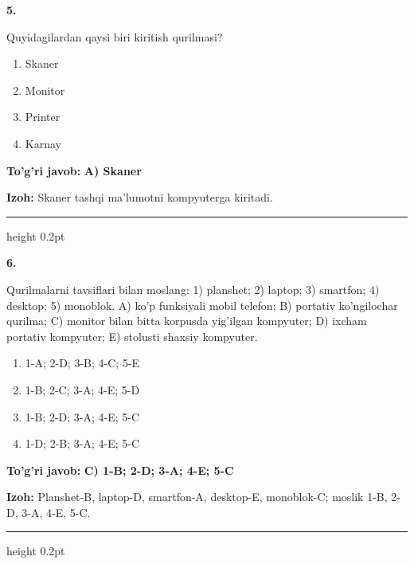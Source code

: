 \documentclass[10pt,a4paper]{article}
\begin{document}
{\bfseries\sffamily\color{ink} 5.}
\par
Quyidagilardan qaysi biri kiritish qurilmasi?
\begin{enumerate}[label=\Alph*),leftmargin=9mm]
\item Skaner
\item Monitor
\item Printer
\item Karnay
\end{enumerate}
\begin{tcolorbox}[enhanced,breakable,colback=teal!4,colframe=teal!60!black,boxrule=0.45pt,arc=1.2mm,left=2.7mm,right=2.7mm,top=1.8mm,bottom=1.8mm,before skip=2mm,after skip=2mm]
{\bfseries\sffamily\color{teal}To'g'ri javob:} \textbf{A) Skaner}
\par\smallskip
{\bfseries Izoh:} Skaner tashqi ma'lumotni kompyuterga kiritadi.
\end{tcolorbox}
\vspace{2mm}\hrule height 0.2pt\vspace{3mm}

{\bfseries\sffamily\color{ink} 6.}
\par
Qurilmalarni tavsiflari bilan moslang: 1) planshet; 2) laptop; 3) smartfon; 4) desktop; 5) monoblok. A) ko'p funksiyali mobil telefon; B) portativ ko'ngilochar qurilma; C) monitor bilan bitta korpusda yig'ilgan kompyuter; D) ixcham portativ kompyuter; E) stolusti shaxsiy kompyuter.
\begin{enumerate}[label=\Alph*),leftmargin=9mm]
\item 1-A; 2-D; 3-B; 4-C; 5-E
\item 1-B; 2-C; 3-A; 4-E; 5-D
\item 1-B; 2-D; 3-A; 4-E; 5-C
\item 1-D; 2-B; 3-A; 4-E; 5-C
\end{enumerate}
\begin{tcolorbox}[enhanced,breakable,colback=teal!4,colframe=teal!60!black,boxrule=0.45pt,arc=1.2mm,left=2.7mm,right=2.7mm,top=1.8mm,bottom=1.8mm,before skip=2mm,after skip=2mm]
{\bfseries\sffamily\color{teal}To'g'ri javob:} \textbf{C) 1-B; 2-D; 3-A; 4-E; 5-C}
\par\smallskip
{\bfseries Izoh:} Planshet-B, laptop-D, smartfon-A, desktop-E, monoblok-C; moslik 1-B, 2-D, 3-A, 4-E, 5-C.
\end{tcolorbox}
\vspace{2mm}\hrule height 0.2pt\vspace{3mm}
\end{document}
